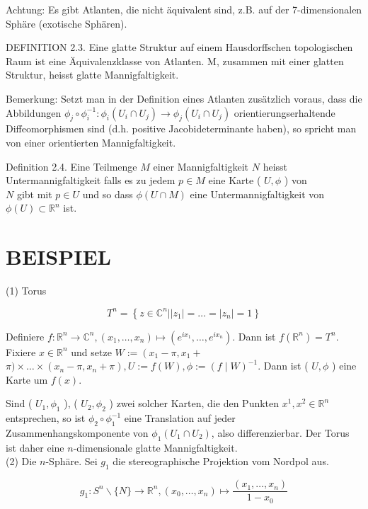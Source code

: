 \documentclass[10pt]{article}
\begin{document}
Achtung: Es gibt Atlanten, die nicht äquivalent sind, z.B. auf der 7-dimensionalen Sphäre (exotische Sphären).

DEFINITION 2.3. Eine glatte Struktur auf einem Hausdorffschen topologischen Raum ist eine Äquivalenzklasse von Atlanten. M, zusammen mit einer glatten Struktur, heisst glatte Mannigfaltigkeit.

Bemerkung: Setzt man in der Definition eines Atlanten zusätzlich voraus, dass die Abbildungen $\phi_{j} \circ \phi_{i}^{-1}: \phi_{i}\left(U_{i} \cap U_{j}\right) \rightarrow \phi_{j}\left(U_{i} \cap U_{j}\right)$ orientierungserhaltende Diffeomorphismen sind (d.h. positive Jacobideterminante haben), so spricht man von einer orientierten Mannigfaltigkeit.

Definition 2.4. Eine Teilmenge $M$ einer Mannigfaltigkeit $N$ heisst Untermannigfaltigkeit falls es zu jedem $p \in M$ eine Karte ( $U, \phi$ ) von\\
$N$ gibt mit $p \in U$ und so dass $\phi(U \cap M)$ eine Untermannigfaltigkeit von $\phi(U) \subset \mathbb{R}^{n}$ ist.

\section*{BEISPIEL}
(1) Torus

$$
T^{n}=\left\{z \in \mathbb{C}^{n}| | z_{1}\left|=\ldots=\left|z_{n}\right|=1\right\}\right.
$$

Definiere $f: \mathbb{R}^{n} \rightarrow \mathbb{C}^{n},\left(x_{1}, \ldots, x_{n}\right) \mapsto\left(e^{i x_{1}}, \ldots, e^{i x_{n}}\right)$. Dann ist $f\left(\mathbb{R}^{n}\right)=T^{n}$. Fixiere $x \in \mathbb{R}^{n}$ und setze $W:=\left(x_{1}-\pi, x_{1}+\right.$ $\pi) \times \ldots \times\left(x_{n}-\pi, x_{n}+\pi\right), U:=f(W), \phi:=(f \mid W)^{-1}$. Dann ist ( $U, \phi$ ) eine Karte um $f(x)$.

Sind ( $U_{1}, \phi_{1}$ ), ( $U_{2}, \phi_{2}$ ) zwei solcher Karten, die den Punkten $x^{1}, x^{2} \in \mathbb{R}^{n}$ entsprechen, so ist $\phi_{2} \circ \phi_{1}^{-1}$ eine Translation auf jeder Zusammenhangskomponente von $\phi_{1}\left(U_{1} \cap U_{2}\right)$, also differenzierbar. Der Torus ist daher eine $n$-dimensionale glatte Mannigfaltigkeit.\\
(2) Die $n$-Sphäre. Sei $g_{1}$ die stereographische Projektion vom Nordpol aus.

$$
g_{1}: S^{n} \backslash\{N\} \rightarrow \mathbb{R}^{n},\left(x_{0}, \ldots, x_{n}\right) \mapsto \frac{\left(x_{1}, \ldots, x_{n}\right)}{1-x_{0}}
$$
\end{document}
